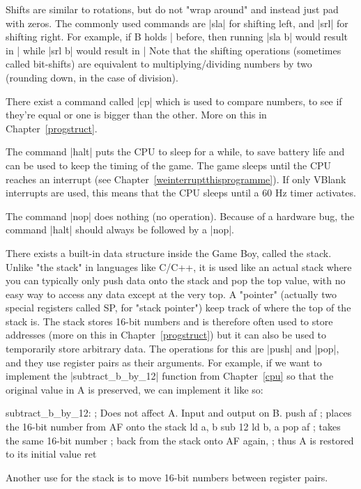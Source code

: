 \documentclass[11pt]{book}
\begin{document}
Shifts are similar to rotations, but do not "wrap around" and instead just pad with zeros. The commonly used commands are |sla| for shifting left, and |srl| for shifting right. For example, if B holds |%
before, then running |sla b| would result in |%
while |srl b| would result in |%
Note that the shifting operations (sometimes called bit-shifts) are equivalent to multiplying/dividing numbers by two (rounding down, in the case of division). 

There exist a command called |cp| which is used to compare numbers, to see if they're equal or one is bigger than the other. More on this in Chapter~\ref{progstruct}.

The command |halt| puts the CPU to sleep for a while, to save battery life and can be used to keep the timing of the game. The game sleeps until the CPU reaches an interrupt (see Chapter~\ref{weinterruptthisprogramme}). If only VBlank interrupts are used, this means that the CPU sleeps until a 60 Hz timer activates.

The command |nop| does nothing (no operation). Because of a hardware bug, the command |halt| should always be followed by a |nop|.

There exists a built-in data structure inside the Game Boy, called the stack. Unlike "the stack" in languages like C/C++, it is used like an actual stack where you can typically only push data onto the stack and pop the top value, with no easy way to access any data except at the very top. A "pointer" (actually two special registers called SP, for "stack pointer") keep track of where the top of the stack is. The stack stores 16-bit numbers and is therefore often used to store addresses (more on this in Chapter~\ref{progstruct}) but it can also be used to temporarily store arbitrary data. The operations for this are |push| and |pop|, and they use register pairs as their arguments. For example, if we want to implement the |subtract_b_by_12| function from Chapter~\ref{cpu} so that the original value in A is preserved, we can implement it like so:

\begin{code}
subtract_b_by_12:
  ; Does not affect A. Input and output on B.
  push af ; places the 16-bit number from AF onto the stack
  ld a, b
  sub 12
  ld b, a
  pop af ; takes the same 16-bit number
  ; back from the stack onto AF again,
  ; thus A is restored to its initial value
  ret 
\end{code}

Another use for the stack is to move 16-bit numbers between register pairs. 
\end{document}
